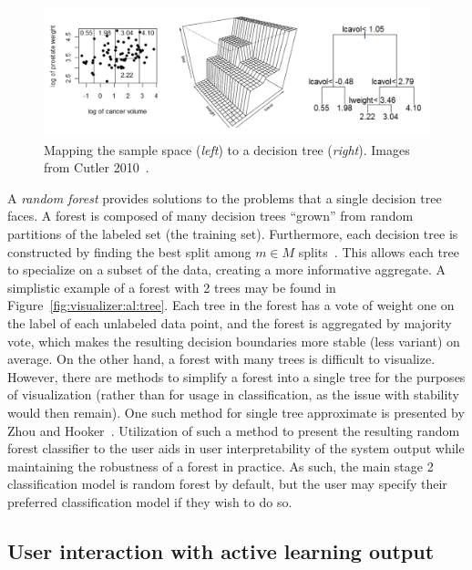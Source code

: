 \begin{figure}[htb]
	\begin{center}
		\includegraphics[width=1\linewidth]{ch-visualizer/figures/decisiontree}
		\caption[Mapping the sample space to a decision tree.]{Mapping the 
		sample space (\textit{left}) to a decision tree (\textit{right}). 
		Images from Cutler 2010~\cite{cutler2010}.}
		\label{fig:visualizer:plotgeneration:tree}
	\end{center}
\end{figure}

A \textit{random forest} provides solutions to the problems that a single 
decision tree faces. A forest is composed of many decision trees 
``grown'' from random partitions of the labeled set (the training set). 
Furthermore, each decision tree is constructed by finding the best split among 
$m \in M$ splits~\cite{cutler2010}. This allows each tree to specialize on a 
subset of the data, 
creating a more informative aggregate. A simplistic example of a forest with 2 
trees may be found in Figure~\ref{fig:visualizer:al:tree}. Each tree in the 
forest has a vote of weight one on the label of each unlabeled data point, and 
the forest is aggregated by majority vote, which makes the resulting decision 
boundaries more stable (less variant) on average. On the other hand, a forest 
with many trees is difficult to visualize. However, there are methods to 
simplify a forest into a single tree for the purposes of visualization (rather 
than for usage in classification, as the issue with stability would then 
remain). One such method for single tree approximate is presented by Zhou and 
Hooker~\cite{zhou2016}. Utilization of such a method to present the resulting 
random forest classifier to the user aids in user interpretability of the 
system output while maintaining the robustness of a forest in practice. 
As such, the main stage 2 classification model is random 
forest by default, but the user may specify their preferred classification 
model if they wish to do so.

\subsection{User interaction with active learning output}
\label{sec:visualizer:plotgeneration:user}

